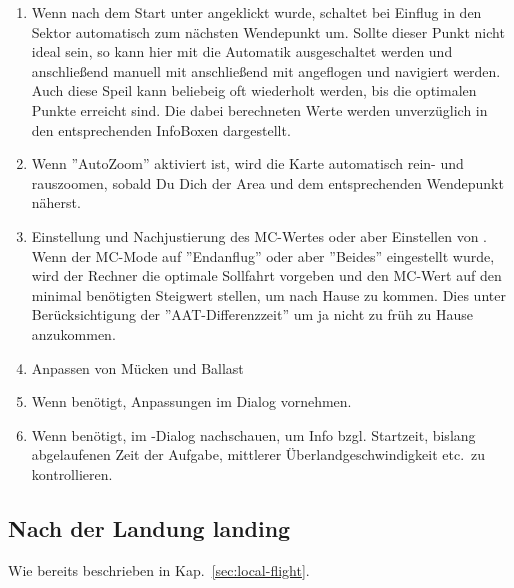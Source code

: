 \begin{enumerate}
\begin{center}
\end{center}
\achtung \item  Wenn nach dem Start unter  angeklickt wurde, schaltet \xc bei Einflug in den Sektor
automatisch zum nächsten Wendepunkt um.
Sollte dieser Punkt nicht ideal sein, so kann hier mit   die Automatik ausgeschaltet werden und anschließend
manuell mit anschließend mit  angeflogen und navigiert werden. Auch diese Speil kann beliebeig oft wiederholt werden, bis die optimalen Punkte erreicht sind.
Die dabei berechneten Werte werden unverzüglich in den entsprechenden InfoBoxen dargestellt.
\item Wenn ''AutoZoom'' aktiviert ist, wird die Karte automatisch rein- und rauszoomen, sobald Du Dich der Area und
dem entsprechenden Wendepunkt näherst.
\item  Einstellung und Nachjustierung  des MC-Wertes oder aber Einstellen von  .
Wenn der MC-Mode auf ''Endanflug'' oder aber ''Beides'' eingestellt wurde, wird der Rechner die optimale Sollfahrt vorgeben und den MC-Wert auf
den minimal benötigten Steigwert  stellen, um nach Hause zu kommen.
Dies unter Berücksichtigung der ''AAT-Differenzzeit'' um ja nicht zu früh zu Hause anzukommen.
\item  Anpassen von Mücken und Ballast
\item  Wenn benötigt, Anpassungen im  Dialog vornehmen.
\item  Wenn benötigt, im -Dialog nachschauen, um Info bzgl.  Startzeit,
bislang abgelaufenen Zeit der Aufgabe, mittlerer Überlandgeschwindigkeit etc.\ zu kontrollieren.
 \end{enumerate}

\subsection*{Nach der Landung landing}
Wie bereits  beschrieben in Kap.~\ref{sec:local-flight}.
